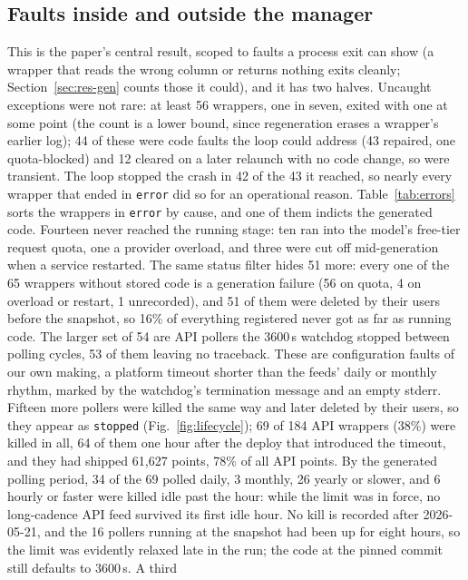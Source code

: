\documentclass[conference]{IEEEtran}
\begin{document}
\subsection{Faults inside and outside the manager}
\label{sec:res-faults}

This is the paper's central result, scoped to faults a process exit can show (a
wrapper that reads the wrong column or returns nothing exits cleanly;
Section~\ref{sec:res-gen} counts those it could), and it has two halves. Uncaught exceptions were
not rare: at least 56 wrappers, one in seven, exited with one at some point (the
count is a lower bound, since regeneration erases a wrapper's earlier log); 44 of
these were code faults the loop could address (43 repaired, one quota-blocked) and 12
cleared on a later relaunch with no code change, so were transient. The loop stopped
the crash in 42 of the 43 it reached, so nearly every wrapper that ended in
\texttt{error} did so for an operational reason. Table~\ref{tab:errors} sorts the
\nErrorW{} wrappers in \texttt{error} by cause, and one of them indicts the generated
code. Fourteen never reached the running stage: ten ran into the model's free-tier
request quota, one a provider overload, and three were cut off mid-generation when a
service restarted. The same status filter hides 51 more: every one of the 65 wrappers
without stored code is a generation failure (56 on quota, 4 on overload or restart,
1 unrecorded), and 51 of them were deleted by their users before the snapshot, so 16\%
of everything registered never got as far as running code. The larger set of 54 are API pollers the
3600\,s watchdog stopped between polling cycles, 53 of them leaving no traceback. These are
configuration faults of our own making, a platform timeout shorter than the feeds'
daily or monthly rhythm, marked by the watchdog's termination message and an empty
stderr. Fifteen more pollers were killed the same
way and later deleted by their users, so they appear as \texttt{stopped}
(Fig.~\ref{fig:lifecycle}); 69 of 184 API wrappers (38\%) were killed in all, 64 of
them one hour after the deploy that introduced the timeout, and they had shipped
61{,}627 points, 78\% of all API points. By
the generated polling period, 34 of the 69 polled daily, 3 monthly, 26 yearly or
slower, and 6 hourly or faster were killed idle past the hour: while the limit was in
force, no long-cadence API feed survived its first idle hour. No kill is recorded after 2026-05-21, and the 16 pollers running at
the snapshot had been up for eight hours, so the limit was evidently relaxed late in
the run; the code at the pinned commit still defaults to 3600\,s. A third
\end{document}
